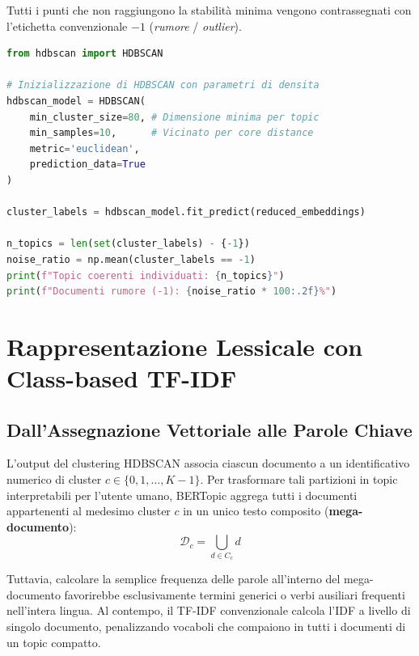 Tutti i punti che non raggiungono la stabilità minima vengono contrassegnati con l'etichetta convenzionale \textbf{$-1$} (\textit{rumore} / \textit{outlier}).

\begin{lstlisting}[language=Python, caption={Clustering dei vettori ridotti tramite HDBSCAN.}]
from hdbscan import HDBSCAN

# Inizializzazione di HDBSCAN con parametri di densita
hdbscan_model = HDBSCAN(
    min_cluster_size=80, # Dimensione minima per topic
    min_samples=10,      # Vicinato per core distance
    metric='euclidean',
    prediction_data=True
)

cluster_labels = hdbscan_model.fit_predict(reduced_embeddings)

n_topics = len(set(cluster_labels) - {-1})
noise_ratio = np.mean(cluster_labels == -1)
print(f"Topic coerenti individuati: {n_topics}")
print(f"Documenti rumore (-1): {noise_ratio * 100:.2f}%")
\end{lstlisting}

\FloatBarrier
\section{Rappresentazione Lessicale con Class-based TF-IDF}
\label{sec:lab-ctfidf}

\FloatBarrier
\subsection{Dall'Assegnazione Vettoriale alle Parole Chiave}
\label{subsec:lab-ctfidf-formulation}

L'output del clustering HDBSCAN associa ciascun documento a un identificativo numerico di cluster $c \in \{0, 1, \dots, K-1\}$. Per trasformare tali partizioni in topic interpretabili per l'utente umano, BERTopic aggrega tutti i documenti appartenenti al medesimo cluster $c$ in un unico testo composito (\textbf{mega-documento}):
\begin{equation}
    \mathcal{D}_c = \bigcup_{d \in C_c} d
\end{equation}

Tuttavia, calcolare la semplice frequenza delle parole all'interno del mega-documento favorirebbe esclusivamente termini generici o verbi ausiliari frequenti nell'intera lingua. Al contempo, il TF-IDF convenzionale calcola l'IDF a livello di singolo documento, penalizzando vocaboli che compaiono in tutti i documenti di un topic compatto.

